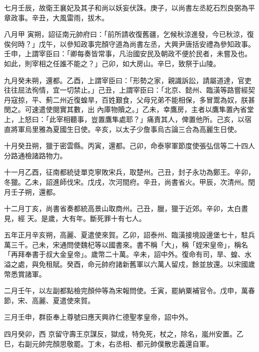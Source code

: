 \begin{pinyinscope}
 七月壬辰，故衛王襄妃及其子和尚以妖妄伏誅。庚子，以尚書左丞紇石烈良弼為平章政事。辛丑，大風雷雨，拔木。



 八月甲
 寅朔，詔征南元帥府曰：「前所請收復舊疆，乞候秋涼進發，今已秋涼，復俟何時？」戊午，以參知政事完顏守道為尚書左丞，大興尹唐括安禮為參知政事。壬申，上謂宰臣曰：「卿每奏皆常事，凡治國安民及朝政不便於民者，未嘗及也。如此，則宰相之任誰不能之？」己卯，如大房山。辛巳，致祭于山陵。



 九月癸未朔，還都。乙酉，上謂宰臣曰：「形勢之家，親識訴訟，請屬道達，官吏往往屈法徇情，宜一切禁止。」己丑，上謂宰臣曰：「北京、懿州、臨潢等路嘗經契丹寇掠，平、薊二州近復蝗旱，百姓艱食，父母兄弟不能相保，多冒鬻為奴，朕甚閔之。可速遣使閱實其數，出
 內庫物贖之。」乙未，幸鷹房，主者以鷹隼置內省堂上，上怒曰：「此宰相聽事，豈置鷹隼處耶？」痛責其人，俾置他所。己亥，以宿直將軍烏里雅為夏國生日使。辛亥，以太子少詹事烏古論三合為高麗生日使。



 十月癸丑朔，獵于密雲縣。丙寅，還都。己卯，命泰寧軍節度使張弘信等二十四人分路通檢諸路物力。



 十一月乙酉，征南都統徒單克寧敗宋兵，取楚州。己丑，封子永功為鄭王。辛卯，冬獵。乙未，詔進師伐宋。戊戌，次河間府。辛丑，尚書省火。甲辰，次清州。閏月壬子朔，還都。



 十二月丁亥，尚書省奏都統高景山取商州。己丑，臘，獵于近郊。辛卯，太白晝見，經
 天。是歲，大有年。斷死罪十有七人。



 五年正月辛亥朔，高麗、夏遣使來賀。乙卯，詔泰州、臨潢接境設邊堡七十，駐兵萬三千。己未，宋通問使魏杞等以國書來。書不稱「大」，稱「姪宋皇帝」，稱名「再拜奉書于叔大金皇帝」。歲幣二十萬。辛未，詔中外。復命有司，旱、蝗、水溢之處，與免租賦。癸酉，命元帥府諸新舊軍以六萬人留戍，餘並放還。以宋國歲幣悉賞諸軍。



 二月壬午，以左副都點檢完顏仲等為宋報問使。壬寅，罷納粟補官令。戊申，萬春節，宋、高麗、夏遣使來賀。



 三月壬申，群臣奉上尊號曰應天興祚仁德聖孝皇帝，詔中外。



 四月癸卯，西
 京留守壽王京謀反，獄成，特免死，杖之，除名，嵐州安置。乙巳，右副元帥完顏思敬罷。丁未，右丞相、都元帥僕散忠義還自軍。




\end{pinyinscope}
